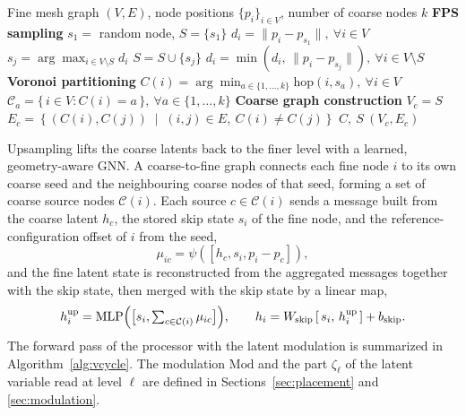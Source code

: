 \documentclass[preprint,12pt]{elsarticle}
\begin{document}
\begin{algorithm}[!htbp]
\caption{FPS--Voronoi coarsening strategy of HI-MGN \cite{lee2026himgn}.}
\label{alg:fpsvoronoi}
\begin{algorithmic}[1]
\Require Fine mesh graph $(V,E)$, node positions $\{p_i\}_{i\in V}$, number of coarse nodes $k$
\Statex \textbf{FPS sampling}
\State $s_1 = $ random node, \quad $S = \{s_1\}$ 
\State $d_i = \lVert p_i - p_{s_1} \rVert,~\forall i \in V$
    \State $s_j = \arg\max_{i \in V \setminus S} d_i$
    \State $S = S \cup \{s_j\}$
    \State $d_i = \min\!\left( d_i,\, \lVert p_i - p_{s_j} \rVert \right),~\forall i \in V \setminus S$
\EndFor
\Statex \textbf{Voronoi partitioning}
\State $C(i) = \arg\min_{a \in \{1,\dots,k\}} \mathrm{hop}(i,s_a),~\forall i \in V$ 
\Statex {}
\State $\mathcal{C}_a = \{\, i \in V : C(i) = a \,\},~\forall a \in \{ 1,\dots,k\}$
\Statex \textbf{Coarse graph construction}
\State $V_c = S$ 
\State $E_c = \left\{ (C(i),C(j)) \;\middle|\; (i,j)\in E,\ C(i)\neq C(j) \right\}$ 
\State \Return $C,\ S\ (V_c,E_c)$
\end{algorithmic}
\end{algorithm}

Upsampling lifts the coarse latents back to the finer level with a learned, geometry-aware GNN. A
coarse-to-fine graph connects each fine node $i$ to its own coarse seed and the neighbouring
coarse nodes of that seed, forming a set of coarse source nodes $\mathcal{C}(i)$. Each source
$c\in\mathcal{C}(i)$ sends a message built from the coarse latent $h_c$, the stored skip state
$s_i$ of the fine node, and the reference-configuration offset of $i$ from the seed,
\begin{equation}
  \mu_{ic} = \psi([h_c,s_i,p_i-p_{c}]),
  \label{eq:interp_msg}
\end{equation}
and the fine latent state is reconstructed from the aggregated messages together with the skip
state, then merged with the skip state by a linear map,
\begin{equation}
  h^{\mathrm{up}}_i = \mathrm{MLP}\Bigl(\bigl[s_i,\textstyle\sum_{c\in\mathcal{C}(i)}\mu_{ic}\bigr]\Bigr),
  \qquad
  h_i = W_{\mathrm{skip}}\,[\,s_i,\,h^{\mathrm{up}}_i\,] + b_{\mathrm{skip}}.
  \label{eq:interp_node}
\end{equation}
The forward pass of the processor with the latent modulation is summarized in
Algorithm~\ref{alg:vcycle}. The modulation $\mathrm{Mod}$ and the part $\zeta_\ell$ of the latent
variable read at level $\ell$ are defined in Sections~\ref{sec:placement} and
\ref{sec:modulation}.
\end{document}
